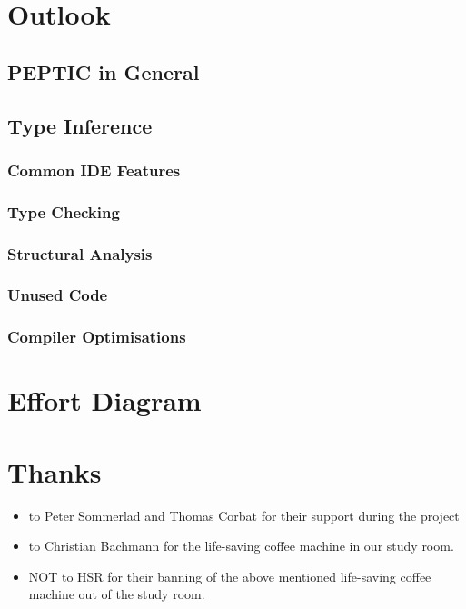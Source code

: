\documentclass[12pt,halfparskip,DIV11,BCOR10mm]{scrreprt}
\begin{document}
\section{Outlook}
\subsection{PEPTIC in General}
\subsection{Type Inference}
\subsubsection{Common IDE Features}
\subsubsection{Type Checking}
\subsubsection{Structural Analysis}
\subsubsection{Unused Code}
\subsubsection{Compiler Optimisations}

\clearpage

\section{Effort Diagram}

\clearpage

\section{Thanks}

\begin{itemize}
	\item to Peter Sommerlad and Thomas Corbat for their support during the project
	\item to Christian Bachmann for the life-saving coffee machine in our study room. 
	\item NOT to HSR for their banning of the above mentioned life-saving coffee machine out of the study room.
\end{itemize}
\end{document}
